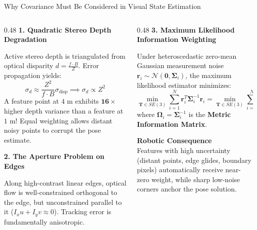 \documentclass[aspectratio=169, 10pt]{beamer}
\begin{document}
\begin{frame}{Why Covariance Must Be Considered in Visual State Estimation}
  \begin{columns}[T]
    \begin{column}{0.48\textwidth}
      {\small \textbf{\textcolor{NavyBlue}{1. Quadratic Stereo Depth Degradation}}}
      \vspace{0.08cm}

      \scriptsize
      Active stereo depth is triangulated from optical disparity $d = \frac{f \cdot B}{Z}$. Error propagation yields:
      \begin{equation}
        \sigma_d \approx \frac{Z^2}{f \cdot B} \sigma_{\text{disp}} \implies \sigma_d \propto Z^2
      \end{equation}
      A feature point at $4\text{ m}$ exhibits $\mathbf{16\times}$ higher depth variance than a feature at $1\text{ m}$! Equal weighting allows distant noisy points to corrupt the pose estimate.

      \vspace{0.15cm}
      {\small \textbf{\textcolor{NavyBlue}{2. The Aperture Problem on Edges}}}
      \vspace{0.08cm}

      \scriptsize
      Along high-contrast linear edges, optical flow is well-constrained orthogonal to the edge, but unconstrained parallel to it ($I_x u + I_y v \approx 0$). Tracking error is fundamentally anisotropic.
    \end{column}

    \begin{column}{0.48\textwidth}
      {\small \textbf{\textcolor{NavyBlue}{3. Maximum Likelihood Information Weighting}}}
      \vspace{0.08cm}

      \scriptsize
      Under heteroscedastic zero-mean Gaussian measurement noise $\mathbf{r}_i \sim \mathcal{N}(\mathbf{0}, \mathbf{\Sigma}_i)$, the maximum likelihood estimator minimizes:
      \begin{equation}
        \min_{\mathbf{T} \in SE(3)} \sum_{i=1}^N \mathbf{r}_i^T \mathbf{\Sigma}_i^{-1} \mathbf{r}_i = \min_{\mathbf{T} \in SE(3)} \sum_{i=1}^N \mathbf{r}_i^T \mathbf{\Omega}_i \mathbf{r}_i
      \end{equation}
      where $\mathbf{\Omega}_i = \mathbf{\Sigma}_i^{-1}$ is the \textbf{Metric Information Matrix}.
      \vspace{0.12cm}

      {\small \textbf{\textcolor{EmeraldGreen}{Robotic Consequence}}}\\
      \scriptsize
      Features with high uncertainty (distant points, edge glides, boundary pixels) automatically receive near-zero weight, while sharp low-noise corners anchor the pose solution.
    \end{column}
  \end{columns}
\end{frame}
\end{document}

